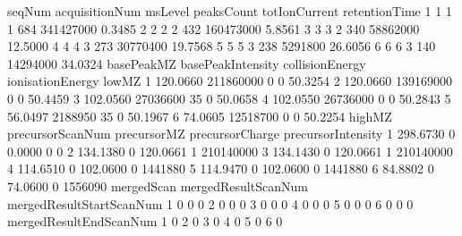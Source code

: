 \documentclass[10pt,a4paper]{article}
\begin{document}
\begin{Schunk}
\begin{Soutput}
  seqNum acquisitionNum msLevel peaksCount totIonCurrent retentionTime
1      1              1       1        684     341427000        0.3485
2      2              2       2        432     160473000        5.8561
3      3              3       2        340      58862000       12.5000
4      4              4       3        273      30770400       19.7568
5      5              5       3        238       5291800       26.6056
6      6              6       3        140      14294000       34.0324
  basePeakMZ basePeakIntensity collisionEnergy ionisationEnergy   lowMZ
1   120.0660         211860000               0                0 50.3254
2   120.0660         139169000               0                0 50.4459
3   102.0560          27036600              35                0 50.0658
4   102.0550          26736000               0                0 50.2843
5    56.0497           2188950              35                0 50.1967
6    74.0605          12518700               0                0 50.2254
    highMZ precursorScanNum precursorMZ precursorCharge precursorIntensity
1 298.6730                0      0.0000               0                  0
2 134.1380                0    120.0661               1          210140000
3 134.1430                0    120.0661               1          210140000
4 114.6510                0    102.0600               0            1441880
5 114.9470                0    102.0600               0            1441880
6  84.8802                0     74.0600               0            1556090
  mergedScan mergedResultScanNum mergedResultStartScanNum
1          0                   0                        0
2          0                   0                        0
3          0                   0                        0
4          0                   0                        0
5          0                   0                        0
6          0                   0                        0
  mergedResultEndScanNum
1                      0
2                      0
3                      0
4                      0
5                      0
6                      0
\end{Soutput}
\end{Schunk}
\end{document}
